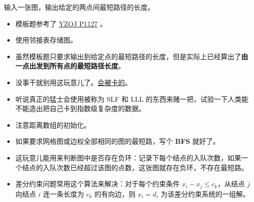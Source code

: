 \noindent 输入一张图，输出给定的两点间最短路径的长度。

\begin{itemize}
    \item 模板题参考了 \href{https://oiproxy.bugminer.top/OnlineJudge/problem_show.php?id=1127}{YZOJ P1127} 。
    \item 使用邻接表存储图。
    \item 虽然模板题只要求输出到给定点的最短路径的长度，但是实际上已经算出了\textbf{由一点出发到所有点的最短路径长度}。
    \item 没事干就别用这玩意儿了。\href{https://www.luogu.com.cn/problem/P4768}{会被卡的}。
    \item 听说真正的猛士会使用被称为 SLF 和 LLL 的东西来赌一把，试验一下人类能不能造出把自己卡到指数级复杂度的数据。
    \item 注意距离数组的初始化。
    \item 如果要求网格图或边权全部相同的图的最短路，写个 \textbf{BFS} 就好了。
    \item 这玩意儿能用来判断图中是否存在负环：记录下每个结点的入队次数，如果一个结点的入队次数已经超过该图的点数，这张图就存在负环，不存在最短路。
    \item 差分约束问题常用这个算法来解决：对于每个约束条件 \textbf{$x_i - x_j \le c_k$}，从结点 \textbf{$j$} 向结点 \textbf{$i$} 连一条长度为 \textbf{$c_k$} 的有向边，则 \textbf{$x_i = d_i$} 为该差分约束系统的一组解。
\end{itemize}